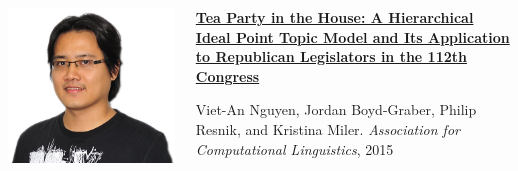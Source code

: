\documentclass[compress]{beamer}
\begin{document}
\begin{frame}{}

  \begin{columns}
      \includegraphics[width=.9\linewidth]{general_figures/an}
        \begin{block}{{\bf
              \href{http://cs.colorado.edu/~jbg//docs/2015_acl_teaparty.pdf}{ Tea Party in the House: A Hierarchical Ideal Point Topic Model and Its Application to Republican Legislators in the 112th Congress}}}

          Viet-An Nguyen, Jordan Boyd-Graber, Philip Resnik, and Kristina Miler.  \emph{Association for Computational Linguistics}, 2015
        \end{block}

  \end{columns}

\end{frame}

\newcommand{\subtwo}[2]{_{#1, #2}}
\newcommand{\subthree}[3]{_{#1, #2, #3}}
\newcommand{\minussubtwo}[2]{_{-{#1, #2}}}
\newcommand{\minussubthree}[3]{_{-{#1, #2, #3}}}
\newcommand{\suptwo}[2]{^{#1, #2}}
\newcommand{\supthree}[3]{^{#1, #2, #3}}
\newcommand{\minussuptwo}[2]{^{-{#1, #2}}}
\newcommand{\minussupthree}[3]{^{-{#1, #2, #3}}}
\newcommand{\prior}[1]{\mathcal{B}#1} %
\newcommand{\greentext}[1]{\textcolor{caribbeangreen}{#1}}
\newcommand{\yellowtext}[1]{\textcolor{amber}{#1}}
\newcommand{\redtext}[1]{\textcolor{red}{#1}}
\newcommand{\bluetext}[1]{\textcolor{blue}{#1}}
\end{document}
